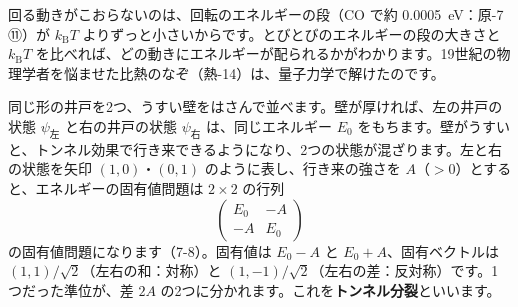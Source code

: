\noindent 回る動きがこおらないのは、回転のエネルギーの段（CO で約 \qty{0.0005}{eV}：原-7 ⑪）が $k_{\mathrm B}T$ よりずっと小さいからです。とびとびのエネルギーの段の大きさと $k_{\mathrm B}T$ を比べれば、どの動きにエネルギーが配られるかがわかります。19世紀の物理学者を悩ませた比熱のなぞ（熱-14）は、量子力学で解けたのです。

\label{ph:原-6:sec11}
同じ形の井戸を2つ、うすい壁をはさんで並べます。壁が厚ければ、左の井戸の状態 $\psi_{\text{左}}$ と右の井戸の状態 $\psi_{\text{右}}$ は、同じエネルギー $E_0$ をもちます。壁がうすいと、トンネル効果で行き来できるようになり、2つの状態が混ざります。左と右の状態を矢印 $(1,0)$・$(0,1)$ のように表し、行き来の強さを $A$（$>0$）とすると、エネルギーの固有値問題は $2\times2$ の行列
\[\begin{pmatrix}E_0&-A\\-A&E_0\end{pmatrix}\]
の固有値問題になります（7-8）。固有値は $E_0-A$ と $E_0+A$、固有ベクトルは $(1,1)/\sqrt2$（左右の和：対称）と $(1,-1)/\sqrt2$（左右の差：反対称）です。1つだった準位が、差 $2A$ の2つに分かれます。これを\textbf{トンネル分裂}といいます。

